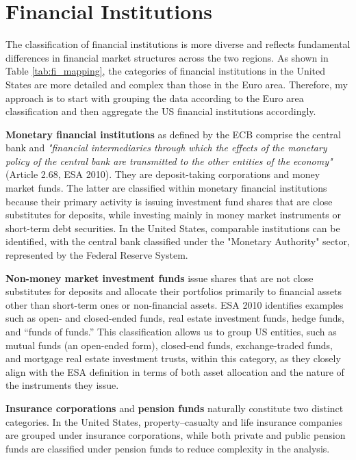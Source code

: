 \section{Financial Institutions}
\label{sec:fi_def}
The classification of financial institutions is more diverse and reflects fundamental differences in financial market structures across the two regions. As shown in Table \ref{tab:fi_mapping}, the categories of financial institutions in the United States are more detailed and complex than those in the Euro area. Therefore, my approach is to start with grouping the data according to the Euro area classification and then aggregate the US financial institutions accordingly.

\textbf{Monetary financial institutions}
as defined by the ECB comprise the central bank and \textit{"financial intermediaries through which the effects of the monetary policy of the central bank are transmitted to the other entities of the economy"} (Article 2.68, ESA 2010). They are deposit-taking corporations and money market funds. The latter are classified within monetary financial institutions because their primary activity is issuing investment fund shares that are close substitutes for deposits, while investing mainly in money market instruments or short-term debt securities. In the United States, comparable institutions can be identified, with the central bank classified under the "Monetary Authority" sector, represented by the Federal Reserve System. 

\textbf{Non-money market investment funds} issue shares that are not close substitutes for deposits and allocate their portfolios primarily to financial assets other than short-term ones or non-financial assets. ESA 2010 identifies examples such as open- and closed-ended funds, real estate investment funds, hedge funds, and “funds of funds.” This classification allows us to group US entities, such as mutual funds (an open-ended form), closed-end funds, exchange-traded funds, and mortgage real estate investment trusts, within this category, as they closely align with the ESA definition in terms of both asset allocation and the nature of the instruments they issue.

\textbf{Insurance corporations} and \textbf{pension funds} naturally constitute two distinct categories. In the United States, property–casualty and life insurance companies are grouped under insurance corporations, while both private and public pension funds are classified under pension funds to reduce complexity in the analysis.

